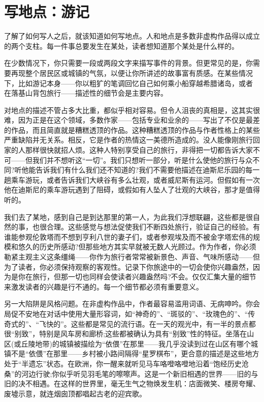 \chapter{写地点：游记}
了解了如何写人之后，就该知道如何写地点。人和地点是多数非虚构作品得以成立的两个支柱。每一件事总要发生在某处，读者想知道那个某处是什么样的。

在少数情况下，你只需要一段或两段文字来描写事件的背景。但更常见的是，你需要再现整个居民区或城镇的气氛，以便让你所讲述的故事富有质感。在某些情况下，比如游记本身——你以粗犷的笔调回忆自己如何乘小船穿越希腊诸岛，或者 在落基山背包旅行——描述性的细节会是主要内容。

对地点的描述不管占多大比重，都似乎相对容易。但令人沮丧的真相是，这其实很难，因为正是在这个领域，多数作家——包括专业和业余的——写出了不仅是最差的作品，而且简直就是糟糕透顶的作品。这种糟糕透顶的作品与作者性格上的某些严重缺陷并无关系。相反，它是作者的热情这一美德所造成的。没人能像刚旅行回家的人那样很快就招人烦。这种人特别享受自己的旅行，非得把一切都告诉大家不可——但我们并不想听这“一切”。我们只想听一部分，听是什么使他的旅行与众不同?听他能告诉我们有什么我们还不知道的?我们不需要他描述在迪斯尼乐园的每一趟乘车游玩，或者告诉我们大峡谷有多么壮观，或者威尼斯有运河。但假如有一次他在迪斯尼的乘车游玩遇到了阻碍，或假如有人坠人了壮观的大峡谷，那才是值得听的。

我们去了某地，感到自己是到达那里的第一人，为此我们浮想联翩，这些都是很自然的事，也很合理。这些感觉与想法促使我们不断四处旅行，验证自己的经验。有谁能参观伦敦塔而不想到亨利八世的妻子们，或者参观埃及而不被金字塔宏伟的规模和悠久的历史所感动?但那些地方其实早就被无数人光顾过。作为作者，你必须勒紧主观主义这条缰绳——你作为旅行者常常被新景色、声音、气味所感动——但为了读者，你必须保持观察的客观性。记录下你旅途中的一切会使你兴趣盎然，因为是你在旅行，但那一切也同样会使读者兴趣盎然吗?不会。仅仅汇集大量的细节来激发读者的兴趣是行不通的。每一个细节都必须有重要意义。

另一大陷阱是风格问题。在非虚构作品中，作者最容易滥用词语、无病呻吟。你会局促不安地在对话中使用大量形容词，如“神奇的”、“斑驳的”、“玫瑰色的”、“传奇式的”、“飞快的”。这些都是常见的流行语。在一天的观光中，有一半的景点都很“别致”，特别是风车房和廊桥;这些都被确认为具有“别致”性的特征。坐落在山区(或丘陵地带)的城镇被描绘为“依偎”在那里——我几乎没读到过在山区有哪个城镇不是“依偎”在那里——乡村被小路间隔得“星罗棋布”，更合意的描述是这些地方处于“半遗忘”状态。在欧洲，你一醒来就听见马车咯噔咯噔地沿着“饱经历史沧桑”的河边行驶;你似乎听见羽毛笔的嚓嚓声。这是一个新旧相遇的世界——旧的与旧的决不相遇。在这样的世界里，毫无生气之物焕发生机：店面微笑、楼房夸耀、废墟示意，就连烟囱顶都唱起古老的迎宾歌。

